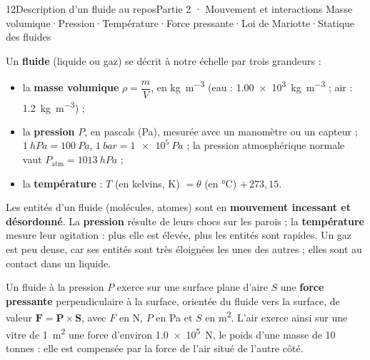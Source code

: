 \begin{ouverture}[gazparfait]{12}{Description d'un fluide au repos}{Partie 2 · Mouvement et interactions}
{Masse volumique\enspace·\enspace Pression\enspace·\enspace Température\enspace·\enspace Force pressante\enspace·\enspace Loi de Mariotte\enspace·\enspace Statique des fluides}
\end{ouverture}
\essentiel
{}
\begin{definition}
Un \textbf{fluide} (liquide ou gaz) se décrit à notre échelle par trois grandeurs :
\begin{itemize}
\item la \textbf{masse volumique} $\rho=\dfrac{m}{V}$, en \unit{kg.m^{-3}} (eau : \qty{1,00e3}{kg.m^{-3}} ; air : \qty{1,2}{kg.m^{-3}}) ;
\item la \textbf{pression} $P$, en pascals (Pa), mesurée avec un manomètre ou un capteur ; $\qty{1}{hPa}=\qty{100}{Pa}$, $\qty{1}{bar}=\qty{1e5}{Pa}$ ;
la pression atmosphérique normale vaut $P_\mathrm{atm}=\qty{1013}{hPa}$ ;
\item la \textbf{température} : $T$ (en kelvins, K) $=\theta$ (en \unit{\degreeCelsius}) $+\,273{,}15$.
\end{itemize}
\end{definition}
\begin{propriete}
Les entités d'un fluide (molécules, atomes) sont en \textbf{mouvement incessant et désordonné}. La \textbf{pression} résulte de
leurs chocs sur les parois ; la \textbf{température} mesure leur agitation : plus elle est élevée, plus les entités sont rapides.
Un gaz est peu dense, car ses entités sont très éloignées les unes des autres ; elles sont au contact dans un liquide.
\end{propriete}
\begin{loi}
Un fluide à la pression $P$ exerce sur une surface plane d'aire $S$ une \textbf{force pressante} perpendiculaire à la surface,
orientée du fluide vers la surface, de valeur $\boldsymbol{F=P\times S}$, avec $F$ en N, $P$ en Pa et $S$ en \unit{m^2}. L'air exerce ainsi sur une vitre de \qty{1}{m^2} une force d'environ \qty{1,0e5}{N}, le poids d'une masse de 10 tonnes : elle est
compensée par la force de l'air situé de l'autre côté.
\end{loi}
